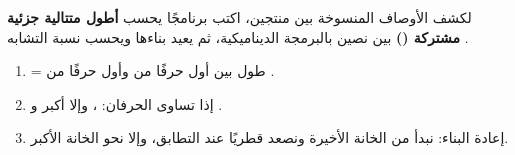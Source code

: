 \begin{statement}
لكشف الأوصاف المنسوخة بين منتجين، اكتب برنامجًا يحسب \textbf{أطول متتالية جزئية مشتركة ()} بين نصين بالبرمجة الديناميكية، ثم يعيد بناءها ويحسب نسبة التشابه .
\end{statement}
\begin{stepsbox}\begin{enumerate}
\item {} = طول  بين أول  حرفًا من  وأول  حرفًا من .
\item إذا تساوى الحرفان: ، وإلا أكبر  و .
\item إعادة البناء: نبدأ من الخانة الأخيرة ونصعد قطريًا عند التطابق، وإلا نحو الخانة الأكبر.
\end{enumerate}\end{stepsbox}

